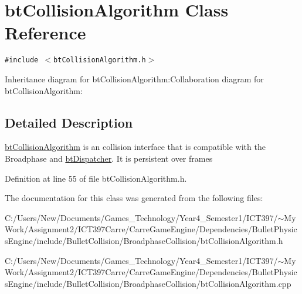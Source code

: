 \hypertarget{classbt_collision_algorithm}{
\section{btCollisionAlgorithm Class Reference}
\label{classbt_collision_algorithm}
}
{\tt \#include $<$btCollisionAlgorithm.h$>$}

Inheritance diagram for btCollisionAlgorithm:Collaboration diagram for btCollisionAlgorithm:

\subsection{Detailed Description}
\hyperlink{classbt_collision_algorithm}{btCollisionAlgorithm} is an collision interface that is compatible with the Broadphase and \hyperlink{classbt_dispatcher}{btDispatcher}. It is persistent over frames 

Definition at line 55 of file btCollisionAlgorithm.h.

The documentation for this class was generated from the following files:\begin{CompactItemize}
\item 
C:/Users/New/Documents/Games\_\-Technology/Year4\_\-Semester1/ICT397/$\sim$My Work/Assignment2/ICT397Carre/CarreGameEngine/Dependencies/BulletPhysicsEngine/include/BulletCollision/BroadphaseCollision/btCollisionAlgorithm.h\item 
C:/Users/New/Documents/Games\_\-Technology/Year4\_\-Semester1/ICT397/$\sim$My Work/Assignment2/ICT397Carre/CarreGameEngine/Dependencies/BulletPhysicsEngine/include/BulletCollision/BroadphaseCollision/btCollisionAlgorithm.cpp\end{CompactItemize}
